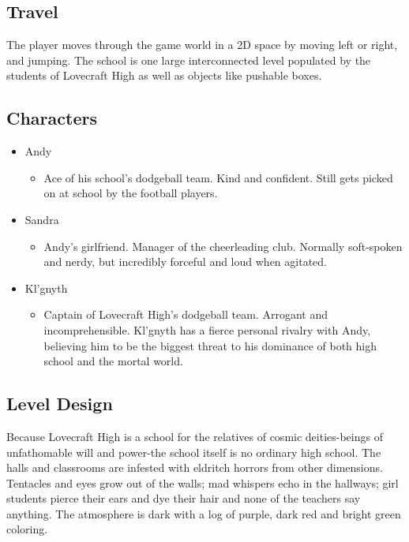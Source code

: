 \documentclass [12pt]{article}
\begin{document}
\subsection*{Travel}

The player moves through the game world in a 2D space by moving left or right, and jumping. The school is one large interconnected level populated by the students of Lovecraft High as well as objects like pushable boxes.
\newpage

\subsection*{Characters}

\begin{itemize}
\item Andy
	\begin{itemize}
	\item Ace of his school's dodgeball team. Kind and confident. Still gets picked on at school by the football players.
	\end{itemize}

\item Sandra
	\begin{itemize}
	\item Andy's girlfriend. Manager of the cheerleading club. Normally soft-spoken and nerdy, but incredibly forceful and loud when agitated.
	\end{itemize}

\item Kl'gnyth
	\begin{itemize}
	\item Captain of Lovecraft High's dodgeball team. Arrogant and incomprehensible. Kl'gnyth has a fierce personal rivalry with Andy, believing him to be the biggest threat to his dominance of both high school and the mortal world.
	\end{itemize}
\end{itemize}

\subsection*{Level Design}

Because Lovecraft High is a school for the relatives of cosmic deities-beings of unfathomable will and power-the school itself is no ordinary high school. The halls and classrooms are infested with eldritch horrors from other dimensions. Tentacles and eyes grow out of the walls; mad whispers echo in the hallways; girl students pierce their ears and dye their hair and none of the teachers say anything. The atmosphere is dark with a log of purple, dark red and bright green coloring.
\end{document}
